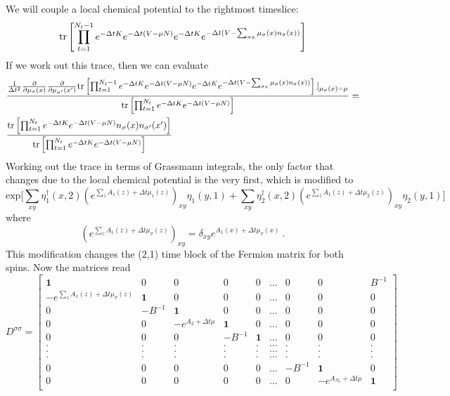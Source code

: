 We will couple a local chemical potential to the rightmost timeslice:
\begin{equation*}
\text{tr}\left[\prod_{t=1}^{N_t-1} e^{-\Delta t K }  e^{-\Delta t (V -\mu N)} e^{-\Delta t K }  e^{-\Delta t (V -\sum_{\sigma x}{\mu_{\sigma}(x) n_{\sigma}(x) })}  \right] 
\end{equation*}
If we work out this trace, then we can evaluate 
\begin{align*}
& \frac{
 \frac{1}{\Delta t^2} \frac{\partial}{ {\partial\mu_{\sigma}(x) }} \frac{\partial}{ {\partial\mu_{\sigma'}(x')} }  \text{tr}\left[\prod_{t=1}^{N_t-1} e^{-\Delta t K }  e^{-\Delta t (V -\mu N)} e^{-\Delta t K }  e^{-\Delta t (V -\sum_{\sigma x}{\mu_{\sigma}(x) n_{\sigma}(x) })}  \right] |_{\mu_{\sigma}(x) = \mu}
 }{ 
 \text{tr}\left[\prod_{t=1}^{N_t} e^{-\Delta t K }  e^{-\Delta t (V -\mu N)}  \right] 
 } 
 =  \\
&  \frac{ \text{tr}\left[\prod_{t=1}^{N_t} e^{-\Delta t K }  e^{-\Delta t (V -\mu N)} n_{\sigma}(x) n_{\sigma'}(x')\right] }{ \text{tr}\left[\prod_{t=1}^{N_t} e^{-\Delta t K }  e^{-\Delta t (V -\mu N)}  \right] }
\end{align*}
Working out the trace in terms of Grassmann integrals, the only factor that changes due to the local chemical potential is the very first, which is modified to 
\begin{equation}
\text{exp}\Bigg[
 \sum_{xy} \eta^{\dagger}_{1}(x,2) (e^{ \sum_z A_1(z) + \Delta t \mu_1(z)})_{xy} \eta_{1}(y,1)
 +
  \sum_{xy} \eta^{\dagger}_{2}(x,2) (e^{ \sum_z A_1(z) + \Delta t \mu_2(z)})_{xy} \eta_{2}(y,1) 
  \Bigg] 
\end{equation}
where 
\begin{equation}
(e^{ \sum_z A_1(z) + \Delta t \mu_{\sigma}(z)})_{xy} = \delta_{xy} e^{ A_1(x) + \Delta t \mu_{\sigma}(x)}~.
\end{equation}
This modification changes the (2,1) time block of the Fermion matrix for both spins. Now the matrices read
\begin{equation}
D^{\sigma \sigma } = \begin{bmatrix} 
\mathbf{1} & 0 & 0 & 0 & 0 & ... & 0 & 0 &  B^{-1} \\
-e^{\sum_z A_1(z)+\Delta t \mu_{\sigma}(z)} & \mathbf{1} & 0 & 0 & 0 & ... & 0 & 0 & 0 \\
0 & -B^{-1} & \mathbf{1} & 0 & 0 & ... & 0 & 0 & 0 \\
0 & 0 & -e^{A_2+\Delta t \mu} & \mathbf{1} & 0 & ... & 0 & 0 & 0 \\
0 & 0 & 0 & -B^{-1} & \mathbf{1} & ... & 0 & 0 & 0 \\
. & . & . & . & . & ... & . & . & . \\
. & . & . & . & . & ... & . & . & . \\
. & . & . & . & . & ... & . & . & . \\
0 & 0 & 0 & 0 & 0 & ... &  -B^{-1} & \mathbf{1} & 0 \\
0 & 0 & 0 & 0 & 0 & ... & 0 & -e^{A_{N_t}+\Delta t \mu} & \mathbf{1} \\
\end{bmatrix}
\end{equation}
